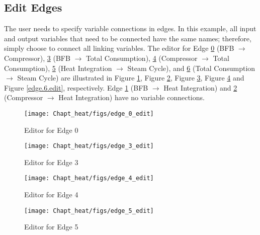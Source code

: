 \subsection{Edit Edges}

The user needs to specify variable connections in edges. In this example, all input and output variables that need to be connected have the same names; therefore, simply choose  to connect all linking variables. The editor for Edge \underline{0} (BFB $\rightarrow$ Compressor), \underline{3} (BFB $\rightarrow$ Total Consumption), \underline{4} (Compressor $\rightarrow$ Total Consumption), \underline{5} (Heat Integration $\rightarrow$ Steam Cycle), and \underline{6} (Total Consumption $\rightarrow$ Steam Cycle) are illustrated in Figure \ref{edge.0.edit}, Figure \ref{edge.3.edit}, Figure \ref{edge.4.edit}, Figure \ref{edge.5.edit} and Figure \ref{edge.6.edit}, respectively. Edge \underline{1} (BFB $\rightarrow$ Heat Integration) and \underline{2} (Compressor $\rightarrow$ Heat Integration) have no variable connections.

\begin{figure}[H]
	\begin{center}
		\texttt{[image: Chapt\_heat/figs/edge\_0\_edit]}
		\caption{Editor for Edge 0}
		\label{edge.0.edit}
	\end{center}
\end{figure}

\begin{figure}[H]
	\begin{center}
		\texttt{[image: Chapt\_heat/figs/edge\_3\_edit]}
		\caption{Editor for Edge 3}
		\label{edge.3.edit}
	\end{center}
\end{figure}

\begin{figure}[H]
	\begin{center}
		\texttt{[image: Chapt\_heat/figs/edge\_4\_edit]}
		\caption{Editor for Edge 4}
		\label{edge.4.edit}
	\end{center}
\end{figure}

\begin{figure}[H]
	\begin{center}
		\texttt{[image: Chapt\_heat/figs/edge\_5\_edit]}
		\caption{Editor for Edge 5}
		\label{edge.5.edit}
	\end{center}
\end{figure}

